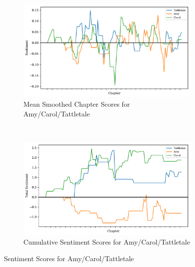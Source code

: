 \documentclass[11pt]{article}
\begin{document}
\begin{figure}[H]
\centering
\begin{subfigure}[t]{0.45\textwidth}
\centering
\includegraphics[width=\textwidth]{Aux Graphs v2/mean_smoothed_sent_scores.pdf}
\caption{Mean Smoothed Chapter Scores for Amy/Carol/Tattletale}
\label{aux_mean}
\end{subfigure}
~
\begin{subfigure}[t]{0.45\textwidth}
\centering
\includegraphics[width=\textwidth]{Aux Graphs v2/total_sent_scores.pdf}
\caption{Cumulative Sentiment Scores for Amy/Carol/Tattletale}
\label{aux_total}
\end{subfigure}
\caption{Sentiment Scores for Amy/Carol/Tattletale}
\label{aux_graphs}
\end{figure}
\end{document}

